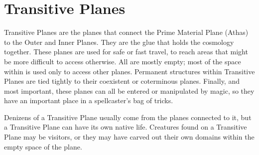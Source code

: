 \section{Transitive Planes}
Transitive Planes are the planes that connect the Prime Material Plane (Athas) to the Outer and Inner Planes. They are the glue that holds the cosmology together. These planes are used for safe or fast travel, to reach areas that might be more difficult to access otherwise. All are mostly empty; most of the space within is used only to access other planes. Permanent structures within Transitive Planes are tied tightly to their coexistent or coterminous planes. Finally, and most important, these planes can all be entered or manipulated by magic, so they have an important place in a spellcaster's bag of tricks.

Denizens of a Transitive Plane usually come from the planes connected to it, but a Transitive Plane can have its own native life. Creatures found on a Transitive Plane may be visitors, or they may have carved out their own domains within the empty space of the plane.





